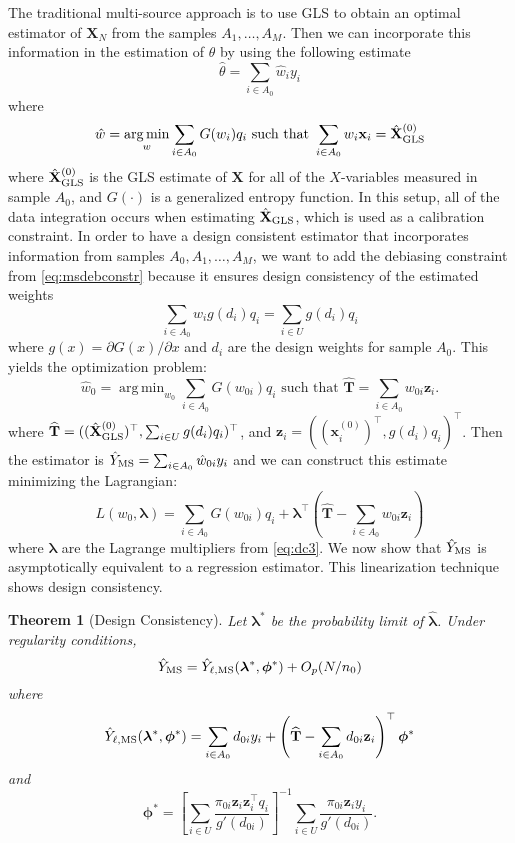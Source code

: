 \documentclass[12pt]{article}
\newtheorem{theorem}{Theorem}
\DeclareMathOperator*{\argmin}{arg\,min}
\renewcommand{\bf}[1]{\mathbf{#1}}
\begin{document}
The traditional multi-source approach \citep{kim2024statistics} is to use
GLS to obtain an optimal estimator of $\bf X_N$ from the
samples $A_1, \dots, A_M$. Then we can incorporate this information in the
estimation of $\theta$ by using the following estimate 
$$\hat \theta = \sum_{i \in A_0} \hat w_i y_i$$
where 
\begin{equation}\label{eq:mstps}
\hat w = \argmin_w \sum_{i \in A_0} G(w_i)q_i \text{ such that } 
\sum_{i \in A_0} w_i \bf x_i = \hat{\bf X}_{\rm{GLS}}^{(0)}
\end{equation}
where $\hat{\bf X}_{\rm{GLS}}^{(0)}$ is the GLS estimate of $\bf X$ for all of
the $X$-variables measured in sample $A_0$, and $G(\cdot)$ is a generalized entropy
function. In this setup, all of the data integration occurs when estimating
$\hat{\bf{X}}_{\rm GLS}$, which is used as a calibration constraint.
In order to have a design consistent estimator that incorporates information from
samples $A_0, A_1, \dots, A_M$, we want to add the debiasing constraint from 
\eqref{eq:msdebconstr} because it ensures design consistency of the estimated
weights
\begin{equation}\label{eq:msdebconstr}
\sum_{i \in A_0} w_{i} g(d_i) q_i = \sum_{i \in U} g(d_i) q_i
\end{equation}
where $g(x) = \partial G(x) / \partial x$ and $d_i$ are the design weights for
sample $A_0$. This yields the optimization problem:
\begin{equation}\label{eq:dc3}
  \hat w_0 = \argmin_{w_0} \sum_{i \in A_0} G(w_{0i}) q_i \text{ such that }
  \widehat{\bf{T}} = \sum_{i \in A_0} w_{0i} \bf z_i.
\end{equation}
where $\widehat{\bf{T}} = ((\hat{\bf X}_{\rm{GLS}}^{(0)})^\top,
\sum_{i \in U} g(d_i) q_i)^\top$,
and $\bf z_i = ((\bf x_i^{(0)})^\top, g(d_i)q_i)^\top$. Then
the estimator is $\hat Y_{\rm MS} = \sum_{i \in A_0} \hat w_{0i} y_i$ and we can
construct this estimate minimizing the Lagrangian:
$$
L(w_{0}, \bm \lambda) = \sum_{i \in A_0} G(w_{0i}) q_i + {\bm \lambda}^\top
\left(\widehat{\bf{T}} - \sum_{i \in A_0} w_{0i} \bf z_i\right)
$$
where $\bm \lambda$ are the Lagrange multipliers from \eqref{eq:dc3}.
We now show that $\hat Y_{\rm MS}$ is asymptotically equivalent to a regression
estimator. This linearization technique shows design consistency.
\begin{theorem}[Design Consistency]
  Let $\bm \lambda^*$ be the probability limit of $\hat{\bm \lambda}$.
  Under regularity conditions,
  $$
  \hat Y_{\rm MS} = \hat Y_{\ell, \rm MS}(\bm \lambda^*, \bm \phi^*) + O_p(N / n_0)
  $$
  where
  $$
  \hat Y_{\ell, \rm MS}(\bm \lambda^*, \bm \phi^*) = 
  \sum_{i \in A_0} d_{0i} y_i + \left(
    \widehat{\bf T} - \sum_{i \in A_0} d_{0i} \bf z_i
  \right)^\top \bm \phi^*
  $$
  and 
  $$
  \bm \phi^* = 
  \left[\sum_{i \in U} \frac{\pi_{0i} \bf z_i \bf z_i^\top q_i}{g'(d_{0i})}\right]^{-1}
  \sum_{i \in U} \frac{\pi_{0i} \bf z_i y_i}{g'(d_{0i})}.
  $$
\end{theorem}
\end{document}
